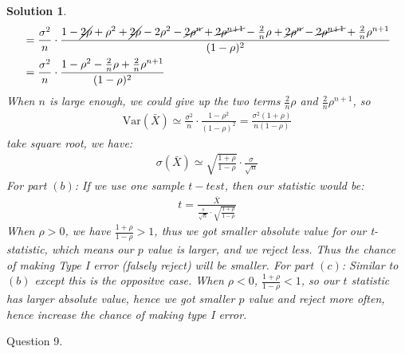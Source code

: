 \documentclass[11pt]{article}
\newtheorem{sol}{Solution}
\begin{document}
\begin{sol}
\begin{align*}
		&= \frac{\sigma^2}{n}\cdot \frac{1 - \cancel{2\rho} + \rho^2 + \cancel{2\rho} - 2\rho^2 - \cancel{2\rho^n} + \cancel{2\rho^{n + 1}} - \frac{2}{n}\rho + \cancel{2\rho^n} - \cancel{2\rho^{n + 1}} + \frac{2}{n}\rho^{n + 1}}{(1 - \rho)^2}\\
		&= \frac{\sigma^2}{n}\cdot \frac{1 - \rho^2- \frac{2}{n}\rho + \frac{2}{n}\rho^{n + 1}}{(1 - \rho)^2}
	\end{align*}
	When $n$ is large enough, we could give up the two terms $\frac{2}{n}\rho$ and $\frac{2}{n}\rho^{n + 1}$, so 
	\begin{align*}
		\text{Var}(\bar{X}) \simeq \frac{\sigma^2}{n}\cdot \frac{1 - \rho^2}{(1 - \rho)^2} = \frac{\sigma^2(1 + \rho)}{n(1 - \rho)}
	\end{align*}
	take square root, we have:
	\begin{align*}
		\sigma(\bar{X}) \simeq \sqrt{\frac{1 + \rho}{1 - \rho}}\cdot \frac{\sigma}{\sqrt{n}}
	\end{align*}
	For part $(b)$:\vskip 2mm
	If we use one sample $t- test$, then our statistic would be:
	\begin{align*}
		t = \frac{\bar{X}}{\frac{s}{\sqrt{n}}\cdot \sqrt{\frac{1 + \rho}{1 - \rho}}}
	\end{align*}
	When $\rho > 0$, we have $\frac{1 + \rho}{1 - \rho} > 1$, thus we got smaller absolute value for our t-statistic, which means our $p$ value is larger, and we reject less. Thus the chance of making Type I error (falsely reject) will be smaller.\vskip 2mm
	For part $(c)$:\vskip 2mm
	Similar to $(b)$ except this is the oppositve case. When $\rho < 0$, $\frac{1 + \rho}{1 - \rho} < 1$, so our $t$ statistic has larger absolute value, hence we got smaller $p$ value and reject more often, hence increase the chance of making type I error.
\end{sol}
Question 9.
\end{document}
